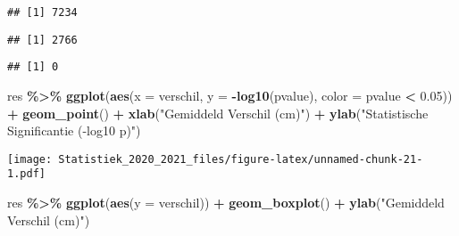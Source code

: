 \documentclass[
  12pt,dutch,coursenotes]{book}
\newenvironment{Shaded}{\begin{snugshade}}{\end{snugshade}}
\newcommand{\DataTypeTok}[1]{\textcolor[rgb]{0.13,0.29,0.53}{#1}}
\newcommand{\DecValTok}[1]{\textcolor[rgb]{0.00,0.00,0.81}{#1}}
\newcommand{\FloatTok}[1]{\textcolor[rgb]{0.00,0.00,0.81}{#1}}
\newcommand{\KeywordTok}[1]{\textcolor[rgb]{0.13,0.29,0.53}{\textbf{#1}}}
\newcommand{\NormalTok}[1]{#1}
\newcommand{\OperatorTok}[1]{\textcolor[rgb]{0.81,0.36,0.00}{\textbf{#1}}}
\newcommand{\StringTok}[1]{\textcolor[rgb]{0.31,0.60,0.02}{#1}}
\theoremstyle{definition}
\theoremstyle{definition}
\theoremstyle{definition}
\theoremstyle{remark}
\begin{document}
\begin{verbatim}
## [1] 7234
\end{verbatim}

\begin{Shaded}
\end{Shaded}

\begin{verbatim}
## [1] 2766
\end{verbatim}

\begin{Shaded}
\end{Shaded}

\begin{verbatim}
## [1] 0
\end{verbatim}

\begin{Shaded}
\begin{Highlighting}[]
\NormalTok{res }\OperatorTok{\%\textgreater{}\%}\StringTok{ }\KeywordTok{ggplot}\NormalTok{(}\KeywordTok{aes}\NormalTok{(}\DataTypeTok{x =}\NormalTok{ verschil, }\DataTypeTok{y =} \OperatorTok{{-}}\KeywordTok{log10}\NormalTok{(pvalue), }
    \DataTypeTok{color =}\NormalTok{ pvalue }\OperatorTok{\textless{}}\StringTok{ }\FloatTok{0.05}\NormalTok{)) }\OperatorTok{+}\StringTok{ }\KeywordTok{geom\_point}\NormalTok{() }\OperatorTok{+}\StringTok{ }\KeywordTok{xlab}\NormalTok{(}\StringTok{"Gemiddeld Verschil (cm)"}\NormalTok{) }\OperatorTok{+}\StringTok{ }
\StringTok{    }\KeywordTok{ylab}\NormalTok{(}\StringTok{"Statistische Significantie ({-}log10 p)"}\NormalTok{)}
\end{Highlighting}
\end{Shaded}

\texttt{[image: Statistiek\_2020\_2021\_files/figure-latex/unnamed-chunk-21-1.pdf]}

\begin{Shaded}
\begin{Highlighting}[]
\NormalTok{res }\OperatorTok{\%\textgreater{}\%}\StringTok{ }\KeywordTok{ggplot}\NormalTok{(}\KeywordTok{aes}\NormalTok{(}\DataTypeTok{y =}\NormalTok{ verschil)) }\OperatorTok{+}\StringTok{ }\KeywordTok{geom\_boxplot}\NormalTok{() }\OperatorTok{+}\StringTok{ }
\StringTok{    }\KeywordTok{ylab}\NormalTok{(}\StringTok{"Gemiddeld Verschil (cm)"}\NormalTok{)}
\end{Highlighting}
\end{Shaded}
\end{document}
